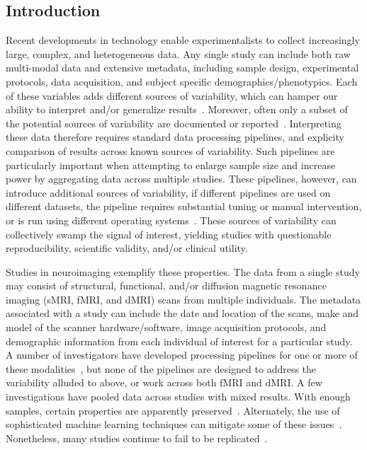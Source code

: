\documentclass[11pt]{article}
\begin{document}
\begin{multicols}{2}


\section{Introduction}

Recent developments in technology enable experimentalists to collect increasingly large, complex, and heterogeneous data. 
Any single study can include both raw multi-modal data and extensive metadata, including sample design, experimental protocols, data acquisition, and subject specific demographics/phenotypics.
Each of these variables adds different sources of variability, which can hamper our ability to interpret and/or generalize results~\cite{Kelly2012, Kaiser}. 
Moreover, often only a subset of the potential sources of variability are documented or reported~\cite{Yan2013-vy}.  
Interpreting these data therefore requires standard data processing pipelines, and explicity comparison of results across known sources of variability.
Such pipelines are particularly important when attempting to enlarge sample size and increase power by aggregating data across multiple studies.
These pipelines, however, can introduce additional sources of variability, if different pipelines are used on different datasets, the pipeline requires substantial tuning or manual intervention, or is run using different operating systems~\cite{Gronenschild2012-of}.
These sources of variability can collectively swamp the signal of interest, yielding studies with questionable reproducibility, scientific validity, and/or clinical utility. 

Studies in neuroimaging exemplify these properties.
The data from a single study may consist of structural, functional, and/or diffusion magnetic resonance imaging (sMRI, fMRI, and dMRI) scans from multiple individuals.
The metadata associated with a study can include the date and location of the scans, make and model of the scanner hardware/software, image acquisition protocols, and demographic information from each individual of interest for a particular study.
A number of investigators have developed  processing pipelines for one or more of these modalities~\cite{Cui2013, Daducci2012, mrcap, migraine, Wang2015}, but none of the pipelines are designed to address the  variability alluded to above, or work across both fMRI and dMRI.  
A few investigations have pooled data across studies with mixed results.
With enough samples, certain properties are apparently preserved~\cite{Thompson2016-by,Abrol2017-fk}.
Alternately, the use of sophisticated machine learning techniques can mitigate some of these issues~\cite{varoquaux2013learning}.
Nonetheless, many studies continue to fail to be replicated~\cite{Button2013}.


\end{multicols}
\end{document}
